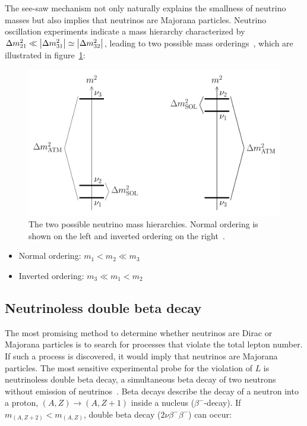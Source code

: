 The see-saw mechanism not only naturally explains the smallness of neutrino masses but also implies that neutrinos are Majorana particles. 
Neutrino oscillation experiments indicate a mass hierarchy characterized by $\Delta m^2_{21} \ll \abs{\Delta m^2_{31}} \simeq \abs{\Delta m^2_{32}}$, leading to two possible mass orderings~\cite{navas_review_2024, thomson_modern_2013, kamland_collaboration_reactor_2013}, which are illustrated in figure~\ref{fig:Neutrino_mass_hierarchy}:

\begin{figure}[t]
    \centering
    \includegraphics[width=0.85\linewidth]{figures/02_neutrino/Neutrino_mass_hierarchy.png}
    \caption{The two possible neutrino mass hierarchies. Normal ordering is shown on the left and inverted ordering on the right~\cite{giunti_fundamentals_2007}.}
    \label{fig:Neutrino_mass_hierarchy}
\end{figure}

\begin{itemize}
    \item Normal ordering: $m_1 < m_2 \ll m_3$
    \item Inverted ordering: $m_3 \ll m_1 < m_2$
\end{itemize}



\subsection{Neutrinoless double beta decay}
\label{sec:0vbb}

The most promising method to determine whether neutrinos are Dirac or Majorana particles is to search for processes that violate the total lepton number. If such a process is discovered, it would imply that neutrinos are Majorana particles.  
The most sensitive experimental probe for the violation of $L$ is neutrinoless double beta decay, a simultaneous beta decay of two neutrons without emission of neutrinos~\cite{navas_review_2024}. 
Beta decays describe the decay of a neutron into a proton, $(A,Z) \rightarrow (A,Z+1)$ inside a nucleus ($\beta^-$-decay). If $m_{(A, Z+2)} < m_{(A,Z)}$, double beta decay ($2 \nu \beta^- \beta^-$) can occur:

